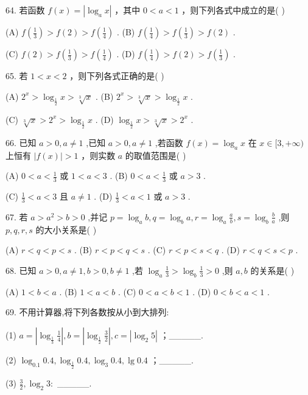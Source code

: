 \documentclass[10pt]{article}
\begin{document}
64. 若函数 \(f\left( x\right)  = \left| {{\log }_{a}x}\right|\) ，其中 \(0 < a < 1\) ，则下列各式中成立的是( )

(A) \(f\left( \frac{1}{3}\right)  > f\left( 2\right)  > f\left( \frac{1}{4}\right)\) . (B) \(f\left( \frac{1}{4}\right)  > f\left( \frac{1}{3}\right)  > f\left( 2\right)\) .

(C) \(f\left( 2\right)  > f\left( \frac{1}{3}\right)  > f\left( \frac{1}{4}\right)\) . (D) \(f\left( \frac{1}{4}\right)  > f\left( 2\right)  > f\left( \frac{1}{3}\right)\) .

65. 若 \(1 < x < 2\) ，则下列各式正确的是( )

(A) \({2}^{x} > {\log }_{\frac{1}{2}}x > \sqrt[3]{x}\) . (B) \({2}^{x} > \sqrt[3]{x} > {\log }_{\frac{1}{2}}x\) .

(C) \(\sqrt[3]{x} > {2}^{x} > {\log }_{\frac{1}{2}}x\) . (D) \({\log }_{\frac{1}{2}}x > \sqrt[3]{x} > {2}^{x}\) .

66. 已知 \(a > 0,a \neq  1\) ,已知 \(a > 0,a \neq  1\) ,若函数 \(f\left( x\right)  = {\log }_{a}x\) 在 \(x \in  \lbrack 3, + \infty )\) 上恒有 \(\left| {f\left( x\right) }\right|  > 1\) ，则实数 \(a\) 的取值范围是( )

(A) \(0 < a < \frac{1}{3}\) 或 \(1 < a < 3\) . (B) \(0 < a < \frac{1}{3}\) 或 \(a > 3\) .

(C) \(\frac{1}{3} < a < 3\) 且 \(a \neq  1\) . (D) \(\frac{1}{3} < a < 1\) 或 \(a > 3\) .

67. 若 \(a > {a}^{2} > b > 0\) ,并记 \(p = {\log }_{a}b,q = {\log }_{b}a,r = {\log }_{a}\frac{a}{b},s = {\log }_{b}\frac{b}{a}\) ,则 \(p,q,r,s\) 的大小关系是( )

(A) \(r < q < p < s\) . (B) \(r < p < q < s\) . (C) \(r < p < s < q\) . (D) \(r < q < s < p\) .

68. 已知 \(a > 0,a \neq  1,b > 0,b \neq  1\) ,若 \({\log }_{a}\frac{1}{3} > {\log }_{b}\frac{1}{3} > 0\) ,则 \(a,b\) 的关系是( )

(A) \(1 < b < a\) . (B) \(1 < a < b\) . (C) \(0 < a < b < 1\) . (D) \(0 < b < a < 1\) .

69. 不用计算器,将下列各数按从小到大排列:

(1) \(a = \left| {{\log }_{\frac{1}{3}}\frac{1}{4}}\right| ,b = \left| {{\log }_{\frac{1}{2}}\frac{3}{2}}\right| ,c = \left| {{\log }_{2}5}\right|\) ；\_\_\_\_\_.

(2) \({\log }_{0.1}{0.4},{\log }_{\frac{1}{2}}{0.4},{\log }_{3}{0.4},\lg {0.4}\) ；\_\_\_\_\_.

(3) \(\frac{3}{2},{\log }_{2}3 :\) \_\_\_\_\_.
\end{document}
